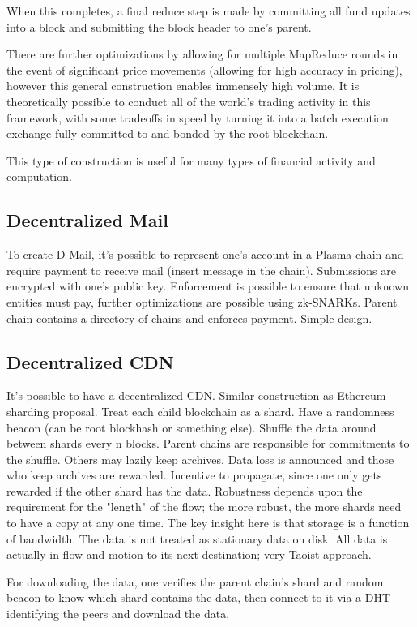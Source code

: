 \documentclass[letterpaper, 11pt]{article}
\begin{document}
When this completes, a final reduce step is made by committing all fund updates
into a block and submitting the block header to one's parent.

There are further optimizations by allowing for multiple MapReduce rounds in the
event of significant price movements (allowing for high accuracy in pricing),
however this general construction enables immensely high volume. It is
theoretically possible to conduct all of the world's trading activity in this
framework, with some tradeoffs in speed by turning it into a batch execution
exchange fully committed to and bonded by the root blockchain.

This type of construction is useful for many types of financial activity and
computation.

\subsection{Decentralized Mail}

To create D-Mail, it's possible to represent one's account in a Plasma chain and
require payment to receive mail (insert message in the chain). Submissions are
encrypted with one's public key. Enforcement is possible to ensure that unknown
entities must pay, further optimizations are possible using zk-SNARKs. Parent
chain contains a directory of chains and enforces payment. Simple design.

\subsection{Decentralized CDN}

It's possible to have a decentralized CDN. Similar construction as Ethereum
sharding proposal. Treat each child blockchain as a shard. Have a randomness
beacon (can be root blockhash or something else). Shuffle the data around
between shards every n blocks. Parent chains are responsible for commitments to
the shuffle. Others may lazily keep archives. Data loss is announced and those
who keep archives are rewarded. Incentive to propagate, since one only gets
rewarded if the other shard has the data. Robustness depends upon the
requirement for the "length" of the flow; the more robust, the more shards need
to have a copy at any one time. The key insight here is that storage is a
function of bandwidth. The data is not treated as stationary data on disk. All
data is actually in flow and motion to its next destination; very Taoist
approach.

For downloading the data, one verifies the parent chain's shard and random
beacon to know which shard contains the data, then connect to it via a DHT
identifying the peers and download the data.
\end{document}

